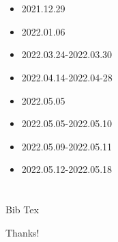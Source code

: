 \documentclass{article}
\begin{document}
	\section{ }	
	
		\begin{frame}
			\begin{itemize}
				\item 2021.12.29   
				\item 2022.01.06   
				\item 2022.03.24-2022.03.30  
				\item 2022.04.14-2022.04-28  
				\item 2022.05.05   
				\item 2022.05.05-2022.05.10  
				\item 2022.05.09-2022.05.11  
				\item 2022.05.12-2022.05.18  
			\end{itemize}
			  \cite{name1}	
		\end{frame}
	
	\section{ }
		
		\begin{frame}[allowframebreaks]
			
			
				
            
			 Bib Tex 
		\end{frame}

\begin{frame}
    \begin{center}
        {\Huge\calligra Thanks!}
    \end{center}
\end{frame}
\end{document}
